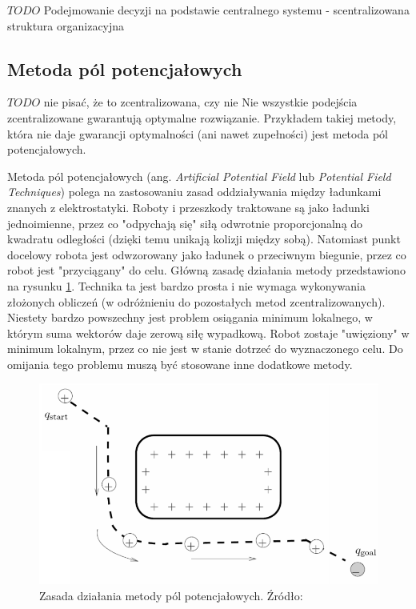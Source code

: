 $TODO$ Podejmowanie decyzji na podstawie centralnego systemu - scentralizowana struktura organizacyjna

\subsection{Metoda pól potencjałowych}
$TODO$ nie pisać, że to zcentralizowana, czy nie
Nie wszystkie podejścia zcentralizowane gwarantują optymalne rozwiązanie. Przykładem takiej metody, która nie daje gwarancji optymalności (ani nawet zupełności) jest metoda pól potencjałowych.

Metoda pól potencjałowych (ang. {\it Artificial Potential Field} lub {\it Potential Field Techniques}) polega na zastosowaniu zasad oddziaływania między ładunkami znanych z elektrostatyki. Roboty i przeszkody traktowane są jako ładunki jednoimienne, przez co "odpychają się" siłą odwrotnie proporcjonalną do kwadratu odległości (dzięki temu unikają kolizji między sobą). Natomiast punkt docelowy robota jest odwzorowany jako ładunek o przeciwnym biegunie, przez co robot jest "przyciągany" do celu.
Główną zasadę działania metody przedstawiono na rysunku \ref{fig:image_potentialfield}.
Technika ta jest bardzo prosta i nie wymaga wykonywania złożonych obliczeń (w odróżnieniu do pozostałych metod zcentralizowanych). Niestety bardzo powszechny jest problem osiągania minimum lokalnego, w którym suma wektorów daje zerową siłę wypadkową. Robot zostaje "uwięziony" w minimum lokalnym, przez co nie jest w stanie dotrzeć do wyznaczonego celu. Do omijania tego problemu muszą być stosowane inne dodatkowe metody. \cite{potentialfield}
\begin{figure}[H]
	\centering
	\includegraphics[width=12cm]{img/potential-field}
	\caption{Zasada działania metody pól potencjałowych. Źródło: \cite{howie_potentialfield}}
	\label{fig:image_potentialfield}
\end{figure}

